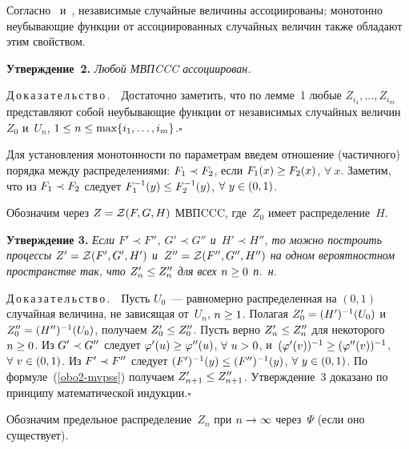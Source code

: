\begin{multicols}{2}
Согласно~\cite{EPW} и~\cite[теорема 1.8]{Bul}, независимые случайные величины
ассоциированы;
монотонно неубывающие функции от ассоциированных случайных величин
так\-же обладают этим свойством.

\smallskip

\noindent
\textbf{Утверждение~2.} \textit{Любой МВПCCC ассоциирован.}

\smallskip

\noindent
Д\,о\,к\,а\,з\,а\,т\,е\,л\,ь\,с\,т\,в\,о\,.\ \
До\-ста\-точ\-но заметить, что по лем\-ме~1
любые $Z_{i_1},\dots, Z_{i_m}$ пред\-став\-ля\-ют собой неубывающие функции
от независимых случайных величин~$Z_0$ и~$U_n$, $1\hm\le n\hm\le\max\{i_1,\dots,i_m\}$.\hfill$\square$

\smallskip

Для установления монотонности по па\-ра\-мет\-рам введем отношение (час\-тич\-но\-го) порядка
меж\-ду распределениями: $F_1\hm\prec F_2$, если $F_1(x)\hm\ge F_2(x)$, 
$\forall\ x$. %
Заметим, что из $F_1\hm\prec F_2$ следует $F^{-1}_1(y)\hm\le F^{-1}_2(y)$, 
$\forall\ y\hm\in (0,1)$.

Обозначим через $Z\hm={\cal Z}(F,G,H)$ МВПCCC, где~$Z_0$ имеет распределение~$H$.

\smallskip

\noindent
\textbf{Утверждение 3.} \textit{Если $F'\prec F''$, $G'\prec G''$ и~$H'\prec H''$, то можно построить
процессы $Z'\hm={\cal Z}(F',G',H')$ и~$Z''\hm={\cal Z}(F'',G'',H'')$ на одном вероятностном
пространстве так, что $Z'_n\hm\le Z''_n$ для всех $n\hm\ge 0$ п.~н.}

\smallskip

\noindent
Д\,о\,к\,а\,з\,а\,т\,е\,л\,ь\,с\,т\,в\,о\,.\ \ Пусть $U_0$~--- 
равномерно распределенная
на $(0,1)$ случайная величина, не зависящая от~$U_n$, $n\hm\ge 1$. Полагая
$Z'_0\hm=(H')^{-1}(U_0)$ и~$Z''_0\hm=(H'')^{-1}(U_0)$, получаем $Z'_0\hm\le Z''_0$.
Пусть верно $Z'_n\hm\le Z''_n$ для некоторого $n\hm\ge 0$.
Из $G'\hm\prec G''$ следует $\varphi'(u)\hm\ge \varphi''(u)$, $\forall\ u\hm>0$, 
и~$(\varphi'(v))^{-1}\hm\ge (\varphi''(v))^{-1}$, $\forall\ v\hm\in (0,1)$.
Из $F'\hm\prec F''$ следует $(F')^{-1}(y)\hm\le (F'')^{-1}(y)$, $\forall\ y\hm\in (0,1)$.
По формуле~(\ref{obo2-mvpss}) получаем $Z'_{n+1}\hm\le Z''_{n+1}$.
Утверж\-де\-ние~3 доказано по принципу математической индукции.\hfill$\square$


Обозначим предельное распределение~$Z_n$ при $n\hm\to\infty$ 
через~$\Psi$ (если оно существует).

\smallskip


\end{multicols}
